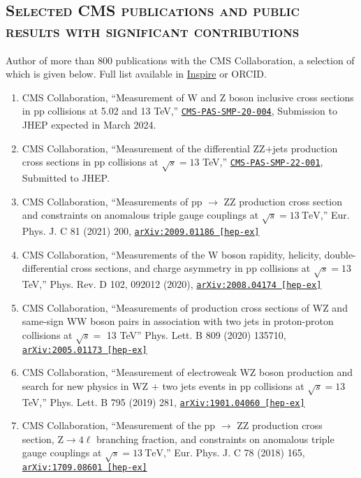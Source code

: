 \documentclass[10pt]{res} %
\begin{document}
\begin{resume}
\section{\textsc{Selected CMS publications and public results with significant contributions}}
Author of more than 800 publications with the CMS Collaboration, a selection of which is given below. Full list available in \href{https://inspirehep.net/authors/1280606}{Inspire} or ORCID. \\
\begin{enumerate}
  \item CMS Collaboration, ``Measurement of W and Z boson inclusive cross sections in pp collisions at 5.02 and 13 TeV,'' \href{https://cds.cern.ch/record/2868090}{\texttt{CMS-PAS-SMP-20-004}}, Submission to JHEP expected in March 2024.
  \item CMS Collaboration, ``Measurement of the differential ZZ$+$jets production cross sections in pp collisions at $\sqrt{s} = 13$ TeV,'' \href{https://cds.cern.ch/record/2859350}{\texttt{CMS-PAS-SMP-22-001}}, Submitted to JHEP.
  \item CMS Collaboration, ``Measurements of pp $\rightarrow$ ZZ production cross section and constraints on anomalous triple gauge couplings at $\sqrt{s} = 13~\mathrm{TeV}$,'' Eur. Phys. J. C 81 (2021) 200, \href{https://arxiv.org/abs/2009.01186}{\texttt{arXiv:2009.01186 [hep-ex]}}
  \item CMS Collaboration, ``Measurements of the W boson rapidity, helicity, double-differential cross sections, and charge asymmetry in pp collisions at $\sqrt{s}=13$\,TeV,'' Phys. Rev. D 102, 092012 (2020), \href{https://arxiv.org/abs/2008.04174}{\texttt{arXiv:2008.04174 [hep-ex]}}
  \item CMS Collaboration, ``Measurements of production cross sections of WZ and same-sign WW boson pairs in association with two jets in proton-proton collisions at $\sqrt{s} =$ 13 TeV'' Phys. Lett. B 809 (2020) 135710, \href{https://arxiv.org/abs/2005.01173}{\texttt{arXiv:2005.01173 [hep-ex]}}
  \item CMS Collaboration, ``Measurement of electroweak WZ boson production and search for new physics in WZ $+$ two jets events in pp collisions at $\sqrt{s}=13$\,TeV,'' Phys. Lett. B 795 (2019) 281, \href{https://arxiv.org/abs/1901.04060} {\texttt{arXiv:1901.04060 [hep-ex]}}
  \item CMS Collaboration, ``Measurement of the pp $\rightarrow$ ZZ production cross section, $\mathrm{Z} \to 4\ell$ branching fraction, and constraints on anomalous triple gauge couplings at $\sqrt{s} = 13~\mathrm{TeV}$,'' Eur. Phys. J. C 78 (2018) 165, \href{https://arxiv.org/abs/1709.08601}{\texttt{arXiv:1709.08601 [hep-ex]}}

\end{enumerate}
\end{resume}
\end{document}
